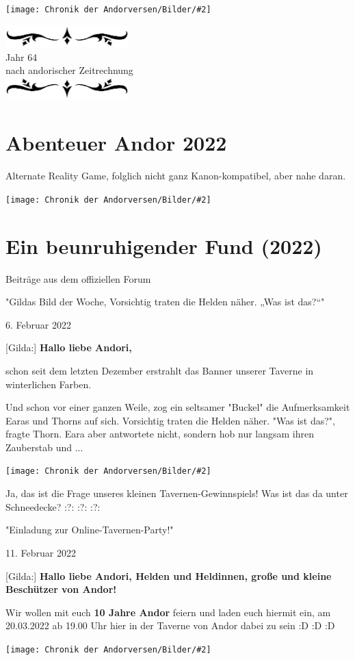 \documentclass[10pt, a4paper, oneside]{book}
\newcommand{\fillbreak}{\vspace*{\fill}\columnbreak}
\newcommand{\produkt}[1]{%
    \section{#1}%
    \label{Produkt: #1}%
}
\newcommand{\storytext}[1]{%
    \section{#1}%
    \label{Storytext: #1}%
}
\newcommand{\bildmitts}[2][height=0.32\textwidth,width=0.48\textwidth,keepaspectratio]{%
    \begin{center}
        \texttt{[image: Chronik der Andorversen/Bilder/\#2]}
    \end{center}
}
\newcommand{\az}[1]{%
    \begin{center}
        \includegraphics[width=180px]{Chronik der Andorversen/verzierung1.png}\\
        {\Huge #1} \\
        {nach andorischer Zeitrechnung}\\
        \includegraphics[width=180px]{Chronik der Andorversen/verzierung2.png}
    \end{center}
    \extramarks{}{#1 a.Z.}
}
\begin{document}
\begin{multicols}{2}
\begin{chapterbox}
    \bildmitts[width=\textwidth]{Die ewige Kälte Helden.jpeg}


\end{chapterbox}




\fillbreak
\az{Jahr 64}
\produkt{Abenteuer Andor 2022}

\begin{center}
    Alternate Reality Game, folglich nicht ganz Kanon-kompatibel, aber nahe daran.
\end{center}

\bildmitts{AA2022 Tavernen-Party 15.jpeg}




\storytext{Ein beunruhigender Fund (2022)}

\begin{center}
    Beiträge aus dem offiziellen Forum

    "Gildas Bild der Woche, Vorsichtig traten die Helden näher. „Was ist das?“"

    6. Februar 2022
\end{center}



[Gilda:] \textbf{Hallo liebe Andori,}

schon seit dem letzten Dezember erstrahlt das Banner unserer Taverne in winterlichen Farben.

Und schon vor einer ganzen Weile, zog ein seltsamer "Buckel" die Aufmerksamkeit Earas und Thorns auf sich. Vorsichtig traten die Helden näher. "Was ist das?", fragte Thorn. Eara aber antwortete nicht, sondern hob nur langsam ihren Zauberstab und ...

\bildmitts{AA2022 Was ist das 1.jpeg}

Ja, das ist die Frage unseres kleinen Tavernen-Gewinnspiels! Was ist das da unter Schneedecke? :?: :?: :?:


\begin{center}
    "Einladung zur Online-Tavernen-Party!"

    11. Februar 2022
\end{center}


[Gilda:] \textbf{Hallo liebe Andori, Helden und Heldinnen, große und kleine Beschützer von Andor!}

Wir wollen mit euch \textbf{10 Jahre Andor} feiern und laden euch hiermit ein, am 20.03.2022 ab 19.00 Uhr hier in der Taverne von Andor dabei zu sein :D :D :D

\bildmitts{AA2022 Einladung zur Online-Tavernen-Party.jpeg}


\end{multicols}
\end{document}
